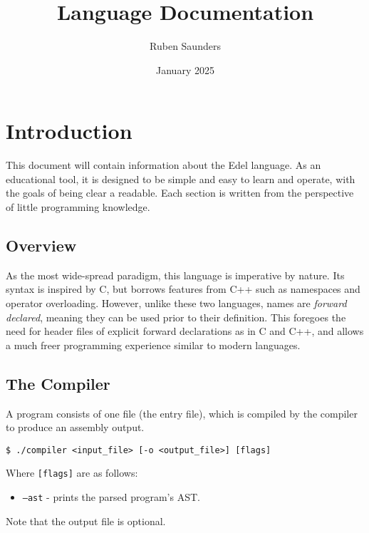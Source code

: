 \documentclass{article}
\title{Language Documentation}
\author{Ruben Saunders}
\date{January 2025}
\begin{document}
    \maketitle
    \tableofcontents

    \newpage

    \section{Introduction}\label{sec:introduction}

    This document will contain information about the Edel language.
    As an educational tool, it is designed to be simple and easy to learn and operate, with the goals of being clear a readable.
    Each section is written from the perspective of little programming knowledge.

    \subsection{Overview}\label{subsec:overview}

    As the most wide-spread paradigm, this language is imperative by nature.
    Its syntax is inspired by C, but borrows features from C++ such as namespaces and operator overloading.
    However, unlike these two languages, names are \textit{forward declared}, meaning they can be used prior to their definition.
    This foregoes the need for header files of explicit forward declarations as in C and C++, and allows a much freer programming experience similar to modern languages.


    \subsection{The Compiler}\label{subsec:the-compiler}

    A program consists of one file (the entry file), which is compiled by the compiler to produce an assembly output.

    \medskip
    \begin{lstlisting}[style=bashconsole]
$ ./compiler <input_file> [-o <output_file>] [flags]
    \end{lstlisting}
    \medskip

    Where \texttt{[flags]} are as follows:
    \begin{itemize}
        \item \texttt{--ast} - prints the parsed program's AST.
    \end{itemize}
    Note that the output file is optional.
\end{document}
